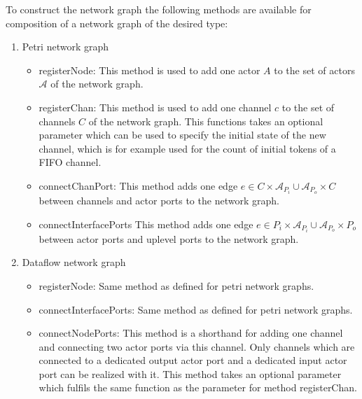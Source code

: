 To construct the network graph the following methods are available for
composition of a network graph of the desired type:
\begin{enumerate}
\item Petri network graph

  \begin{itemize}
  \item registerNode:
    This method is used to add one actor $A$ to the set of actors $\mathcal{A}$
    of the network graph.

  \item registerChan:
    This method is used to add one channel $c$ to the set of channels $C$
    of the network graph. This functions takes an optional parameter which can
    be used to specify the initial state of the new channel, which is
    for example used for the count of initial tokens of a FIFO channel.

  \item connectChanPort:
    This method adds one edge $e \in C \times \mathcal{A}_{P_{i}} \cup \mathcal{A}_{P_{o}} \times C$
    between channels and actor ports to the network graph.

  \item connectInterfacePorts
    This method adds one edge $e \in P_{i} \times \mathcal{A}_{P_{i}} \cup \mathcal{A}_{P_{o}} \times P_{o}$
    between actor ports and uplevel ports to the network graph.

  \end{itemize}

\item Dataflow network graph

  \begin{itemize}
  \item registerNode: Same method as defined for petri network graphs.
  
  \item connectInterfacePorts: Same method as defined for petri network graphs.
  
  \item connectNodePorts:
    This method is a shorthand for adding one channel and
    connecting two actor ports via this channel. Only channels
    which are connected to a dedicated output actor port and
    a dedicated input actor port can be realized with it.
    This method takes an optional parameter which fulfils
    the same function as the parameter for method registerChan.
  
  \end{itemize}

\end{enumerate}

